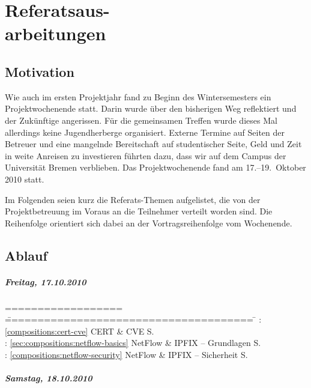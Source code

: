 \chapter[Referatsausarbeitungen]
  {Referatsaus-\\arbeitungen}
\label{chp:compositions}

\section{Motivation}

Wie auch im ersten Projektjahr fand zu Beginn des Wintersemesters ein Projektwochenende
statt. Darin wurde über den bisherigen Weg reflektiert und der Zukünftige angerissen.
Für die gemeinsamen Treffen wurde dieses Mal allerdings keine Jugendherberge organisiert.
Externe Termine auf Seiten der Betreuer und eine mangelnde Bereitschaft auf studentischer
Seite, Geld und Zeit in weite Anreisen zu investieren führten dazu, dass wir auf dem
Campus der Universität Bremen verblieben. Das Projektwochenende fand am 17.--19.~Oktober
2010 statt.

Im Folgenden seien kurz die Referats-Themen aufgelistet, die von der Projektbetreuung im
Voraus an die Teilnehmer verteilt worden sind. Die Reihenfolge orientiert sich dabei
an der Vortragsreihenfolge vom Wochenende.

\section{Ablauf}

\paragraph*{Freitag, 17.10.2010}

\begin{tabbing}
  ================== \= ====================================== \= \kill
  \LM:  \> \ref{compositions:cert-cve} CERT \& CVE                              \> S.~\pageref{compositions:cert-cve}\\
  \AB:  \> \ref{sec:compositions:netflow-basics} NetFlow \& IPFIX -- Grundlagen \> S.~\pageref{sec:compositions:netflow-basics} \\
  \KUH: \> \ref{compositions:netflow-security} NetFlow \& IPFIX -- Sicherheit   \> S.~\pageref{compositions:netflow-security} \\
\end{tabbing}

\paragraph*{Samstag, 18.10.2010}

